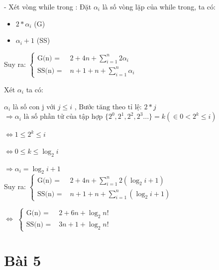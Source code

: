 \documentclass{article}
\newcommand\tab[1][1cm]{\hspace*{#1}}
\begin{document}
- Xét vòng while trong :
Đặt $\alpha_{i}$ là số vòng lặp của while trong, ta có:
\begin{itemize}
    \item $ 2*\alpha_{i}$ (G)
    \item $ \alpha_{i} + 1$ (SS)
\end{itemize}

\tab Suy ra:
\(
\begin{cases}
    \text{G(n) = } & 2 + 4n +  \sum\limits_{i=1}^{n}2\alpha_{i} \\
    \text{SS(n) = } &  n + 1 + n + \sum\limits_{i=1}^{n}\alpha_{i}
\end{cases}
\)
\vspace{5mm}

Xét $\alpha_{i}$ ta có:

\tab $\alpha_{i}$ là số con j với $j \leq  i$ , \(\text{Bước tăng theo tỉ lệ: } 2*j\)\\

\(\Rightarrow  \alpha_{i} \text{ là số phần tử của tập hợp } \{ 2^0, 2^1,  2^2, 2^3... \}
= k (\in 0 < 2^k \leq  i)\) 
\vspace{5mm}

\(\Leftrightarrow  1 \leq  2^k \leq  i\)

\vspace{2mm}
\(\Leftrightarrow  0 \leq k \leq  \log_{2}{i} \) 

\vspace{2mm}
\tab \(\Longrightarrow \alpha_{i} = \log_{2}{i} + 1\)\\


 Suy ra:
\(
\begin{cases}
    \text{G(n) = } & 2 + 4n +  \sum\limits_{i=1}^{n}2(\log_{2}{i} + 1) \\
    \text{SS(n) = } &  n + 1 + n + \sum\limits_{i=1}^{n}(\log_{2}{i} + 1)
\end{cases}
\)
 
\vspace{2mm}
\tab \(\Longleftrightarrow \)   
\(
\begin{cases}
    \text{G(n) = } & 2 + 6n +  \log_{2}{n!}  \\
    \text{SS(n) = } &  3n + 1 + \log_{2}{n!}
\end{cases}
\)


\section*{Bài 5}
\end{document}
